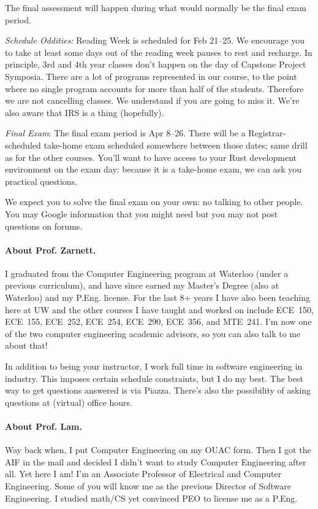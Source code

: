 \documentclass[letterpaper,10pt]{article}
\begin{document}
The final assessment will happen during what would normally be the final exam period. 

\textit{Schedule Oddities:} Reading Week is scheduled for Feb 21--25. We encourage you to take at least some days out of the reading week pauses to rest and recharge. In principle, 3rd and 4th year classes don't happen on the day of Capstone Project Symposia. There are a lot of programs represented in our course, to the point where no single program accounts for more than half of the students. Therefore we are not cancelling classes. We understand if you are going to miss it. We're also aware that IRS is a thing (hopefully).

\textit{Final Exam}: The final exam period is Apr 8--26. There will be a Registrar-scheduled take-home exam scheduled somewhere between those dates; same drill as for the other courses. You'll want to have access to your Rust development environment on the exam day: because it is a take-home exam, we can ask you practical questions.

We expect you to solve the final exam on your own: no talking to other people. You may Google information that you might need but you may not post questions on forums.


\paragraph{About Prof. Zarnett.}
I graduated from the Computer Engineering program at Waterloo (under a previous curriculum), and have since earned my Master's Degree (also at Waterloo) and my P.Eng. license. For the last 8+ years I have also been teaching here at UW and the other courses I have taught and worked on include ECE~150, ECE~155, ECE~252, ECE~254, ECE~290, ECE~356, and MTE~241. I'm now one of the two computer engineering academic advisors, so you can also talk to me about that! 

In addition to being your instructor, I work full time in software engineering in industry. This imposes certain schedule constraints, but I do my best. The best way to get questions answered is via Piazza. There's also the possibility of asking questions at (virtual) office hours.

\paragraph{About Prof. Lam.}
Way back when, I put Computer Engineering on my OUAC form. Then I got the AIF in the mail and decided I didn't want to study Computer Engineering after all. Yet here I am! I'm an Associate Professor of Electrical and Computer Engineering. Some of you will know me as the previous Director of Software Engineering. I studied math/CS yet convinced PEO to license me as a P.Eng.
\end{document}
